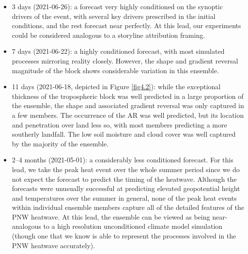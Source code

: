   \begin{itemize}
    \item 3 days (2021-06-26): a forecast very highly conditioned on the synoptic drivers of the event, with several key drivers prescribed in the initial conditions, and the rest forecast near perfectly. At this lead, our experiments could be considered analogous to a storyline attribution framing.
    \item 7 days (2021-06-22): a highly conditioned forecast, with most simulated processes mirroring reality closely. However, the shape and gradient reversal magnitude of the block shows considerable variation in this ensemble.
    \item 11 days (2021-06-18, depicted in Figure \ref{fig4.2}): while the exceptional thickness of the tropospheric block was well predicted in a large proportion of the ensemble, the shape and associated gradient reversal was only captured in a few members. The occurrence of the AR was well predicted, but its location and penetration over land less so, with most members predicting a more southerly landfall. The low soil moisture and cloud cover was well captured by the majority of the ensemble.
    \item 2--4 months (2021-05-01): a considerably less conditioned forecast. For this lead, we take the peak heat event over the whole summer period since we do not expect the forecast to predict the timing of the heatwave. Although the forecasts were unusually successful at predicting elevated geopotential height and temperatures over the summer in general, none of the peak heat events within individual ensemble members capture all of the detailed features of the PNW heatwave. At this lead, the ensemble can be viewed as being near-analogous to a high resolution unconditioned climate model simulation (though one that we know is able to represent the processes involved in the PNW heatwave accurately).
  \end{itemize}

